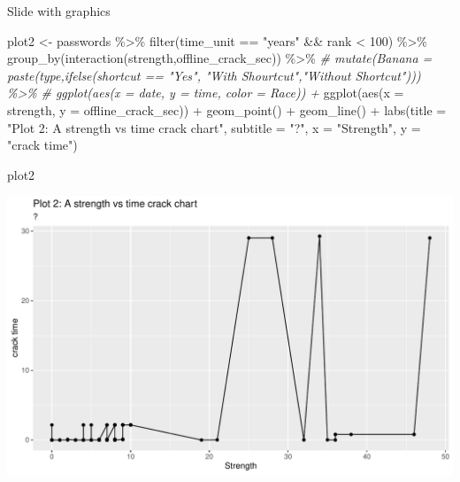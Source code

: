 \documentclass[10pt,ignorenonframetext,aspectratio=169]{beamer}
\newenvironment{Shaded}{\begin{snugshade}}{\end{snugshade}}
\newcommand{\AttributeTok}[1]{\textcolor[rgb]{0.77,0.63,0.00}{#1}}
\newcommand{\CommentTok}[1]{\textcolor[rgb]{0.56,0.35,0.01}{\textit{#1}}}
\newcommand{\DecValTok}[1]{\textcolor[rgb]{0.00,0.00,0.81}{#1}}
\newcommand{\FunctionTok}[1]{\textcolor[rgb]{0.00,0.00,0.00}{#1}}
\newcommand{\NormalTok}[1]{#1}
\newcommand{\OtherTok}[1]{\textcolor[rgb]{0.56,0.35,0.01}{#1}}
\newcommand{\SpecialCharTok}[1]{\textcolor[rgb]{0.00,0.00,0.00}{#1}}
\newcommand{\StringTok}[1]{\textcolor[rgb]{0.31,0.60,0.02}{#1}}
\renewenvironment{Shaded}{\color{black}\begin{snugshade}\color{black}}{\end{snugshade}}
\begin{document}
\begin{frame}[fragile]{Slide with graphics}
\protect\hypertarget{slide-with-graphics}{}
\begin{Shaded}
\begin{Highlighting}[]
\NormalTok{plot2 }\OtherTok{\textless{}{-}}\NormalTok{ passwords }\SpecialCharTok{\%\textgreater{}\%}
    \FunctionTok{filter}\NormalTok{(time\_unit }\SpecialCharTok{==} \StringTok{"years"} \SpecialCharTok{\&\&}\NormalTok{ rank }\SpecialCharTok{\textless{}} \DecValTok{100}\NormalTok{) }\SpecialCharTok{\%\textgreater{}\%}
    \FunctionTok{group\_by}\NormalTok{(}\FunctionTok{interaction}\NormalTok{(strength,offline\_crack\_sec)) }\SpecialCharTok{\%\textgreater{}\%}
    \CommentTok{\# mutate(Banana = paste(type,ifelse(shortcut == "Yes", "With Shourtcut","Without Shortcut"))) \%\textgreater{}\%}
    \CommentTok{\# ggplot(aes(x = date, y = time, color = Race)) +}
    \FunctionTok{ggplot}\NormalTok{(}\FunctionTok{aes}\NormalTok{(}\AttributeTok{x =}\NormalTok{ strength, }\AttributeTok{y =}\NormalTok{ offline\_crack\_sec)) }\SpecialCharTok{+}
    \FunctionTok{geom\_point}\NormalTok{() }\SpecialCharTok{+}
    \FunctionTok{geom\_line}\NormalTok{() }\SpecialCharTok{+}
    \FunctionTok{labs}\NormalTok{(}\AttributeTok{title =} \StringTok{"Plot 2: A strength vs time crack chart"}\NormalTok{, }\AttributeTok{subtitle =} \StringTok{"?"}\NormalTok{, }\AttributeTok{x =} \StringTok{"Strength"}\NormalTok{, }\AttributeTok{y =} \StringTok{"crack time"}\NormalTok{)}

\NormalTok{plot2}
\end{Highlighting}
\end{Shaded}

\begin{center}\includegraphics{Untitled_files/figure-beamer/plot2-1} \end{center}


\end{frame}
\end{document}
